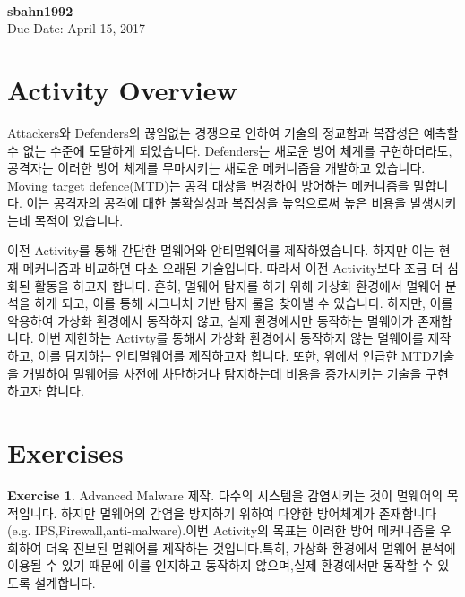 \documentclass[a4paper, 11pt]{article}
\theoremstyle{definition}
\newtheorem{exercise}{Exercise}
\begin{document}
 \\
{\phantom{} \hfill \textbf{sbahn1992}} \\
{\phantom{} \hfill Due Date: April 15, 2017} \\

	\section{Activity Overview}

	Attackers와 Defenders의 끊임없는 경쟁으로 인하여 기술의 정교함과 복잡성은 예측할 수 없는 수준에 도달하게 되었습니다. Defenders는 새로운 방어 체계를 구현하더라도, 공격자는 이러한 방어 체계를 무마시키는 새로운 메커니즘을 개발하고 있습니다. Moving target defence(MTD)는 공격 대상을 변경하여 방어하는 메커니즘을 말합니다. 이는 공격자의 공격에 대한 불확실성과 복잡성을 높임으로써 높은 비용을 발생시키는데 목적이 있습니다.\cite{mtd}

	이전 Activity를 통해 간단한 멀웨어와 안티멀웨어를 제작하였습니다. 하지만 이는 현재 메커니즘과 비교하면 다소 오래된 기술입니다. 따라서 이전 Activity보다 조금 더 심화된 활동을 하고자 합니다. 흔히, 멀웨어 탐지를 하기 위해 가상화 환경에서 멀웨어 분석을 하게 되고\cite{detect}, 이를 통해 시그니처 기반 탐지 룰을 찾아낼 수 있습니다. 하지만, 이를 악용하여 가상화 환경에서 동작하지 않고, 실제 환경에서만 동작하는 멀웨어가 존재합니다.\cite{mtd} 이번 제한하는 Activty를 통해서 가상화 환경에서 동작하지 않는 멀웨어를 제작하고, 이를 탐지하는 안티멀웨어를 제작하고자 합니다. 또한, 위에서 언급한 MTD기술\cite{mtd:2016}을 개발하여 멀웨어를 사전에 차단하거나 탐지하는데 비용을 증가시키는 기술을 구현하고자 합니다.

	\section{Exercises}

	\begin{exercise}

	Advanced Malware 제작.
	다수의 시스템을 감염시키는 것이 멀웨어의 목적입니다. 하지만 멀웨어의 감염을 방지하기 위하여 다양한 방어체계가 존재합니다(e.g. IPS,Firewall,anti-malware).이번 Activity의 목표는 이러한 방어 메커니즘을 우회하여 더욱 진보된 멀웨어를 제작하는 것입니다.특히, 가상화 환경에서 멀웨어 분석에 이용될 수 있기 때문에 이를 인지하고 동작하지 않으며,실제 환경에서만 동작할 수 있도록 설계합니다.

	\end{exercise}
\end{document}
